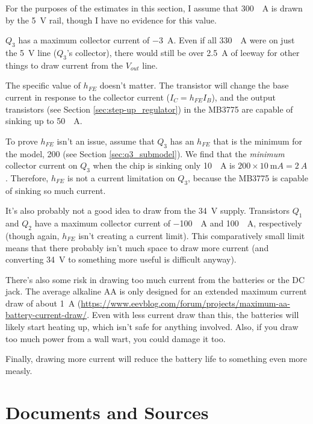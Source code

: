 \documentclass{article}
\newcommand{\Vout}{$V_{out}$}
\newcommand{\model}{\textsf}
\begin{document}
For the purposes of the estimates in this section, I assume that
\qty{300}{\milli{}A} is drawn by the \qty{5}{\volt} rail, though I
have no evidence for this value.

$Q_3$ has a maximum collector current of \qty{-3}{A}. Even if all
\qty{330}{\milli{}A} were on just the \qty{5}{\volt} line ($Q_3$'s
collector), there would still be over \qty{2.5}{A} of leeway for other
things to draw current from the \Vout{} line.

The specific value of $h_{FE}$ doesn't matter. The transistor will
change the base current in response to the collector current
($I_C=h_{FE}I_B$), and the output transistors (see Section
\ref{sec:step-up_regulator}) in the \model{MB3775} are capable of
sinking up to \qty{50}{\milli{}A}.

To prove $h_{FE}$ isn't an issue, assume that $Q_3$ has an $h_{FE}$
that is the minimum for the model, 200 (see Section
\ref{sec:q3_submodel}).  We find that the \textit{minimum} collector
current on $Q_3$ when the chip is sinking only \qty{10}{\milli{}A} is
$200\times{}\qty{10}{\milli{}A}=\qty{2}{A}$. Therefore, $h_{FE}$ is
not a current limitation on $Q_3$, because the \model{MB3775} is
capable of sinking so much current.

It's also probably not a good idea to draw from the \qty{34}{\volt}
supply. Transistors $Q_1$ and $Q_2$ have a maximum collector current
of \qty{-100}{\milli{}A} and \qty{100}{\milli{}A}, respectively
(though again, $h_{FE}$ isn't creating a current limit). This
comparatively small limit means that there probably isn't much space
to draw more current (and converting \qty{34}{\volt} to something more
useful is difficult anyway).

There's also some risk in drawing too much current from the batteries
or the DC jack. The average alkaline AA is only designed for an
extended maximum current draw of about \qty{1}{A}
(\url{https://www.eevblog.com/forum/projects/maximum-aa-battery-current-draw/}.
Even with less current draw than this, the batteries will likely start
heating up, which isn't safe for anything involved. Also, if you draw
too much power from a wall wart, you could damage it too.

Finally, drawing more current will reduce the battery life to
something even more measly.

\section{Documents and Sources}
\label{sec:documents}
\end{document}

